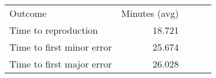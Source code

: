 \begin{tabular}{lrrrr}
\hline\hline
Outcome & Minutes (avg) \\
Time to reproduction & 18.721 \\
Time to first minor error & 25.674 \\
Time to first major error & 26.028 \\
\hline\hline
\end{tabular}
